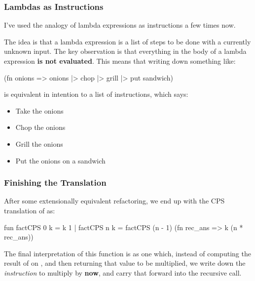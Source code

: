 \documentclass[aspectratio=169, handout]{beamer}
\begin{document}
\begin{frame}[fragile]
  \frametitle{Lambdas as Instructions}

  I've used the analogy of lambda expressions as instructions a few times now.

  \pause
  \vspace{\fill}

  The idea is that a lambda expression is a list of steps to be done with a
  currently unknown input. The key observation is that everything in the body
  of a lambda expression \textbf{is not evaluated}. This means that writing
  down something like:

  \begin{codeblock}
    (fn onions => onions |> chop |> grill |> put sandwich) 
  \end{codeblock}

  is equivalent in intention to a list of instructions, which says:
  \begin{itemize}
    \item Take the onions 
    \item Chop the onions 
    \item Grill the onions 
    \item Put the onions on a sandwich
  \end{itemize}
\end{frame}

\begin{frame}[fragile]
  \frametitle{Finishing the Translation}

  After some extensionally equivalent refactoring, we end up with the 
  CPS translation of  as:

  \begin{codeblock}
    fun factCPS 0 k = k 1
      | factCPS n k = 
          factCPS (n - 1) (fn rec_ans => k (n * rec_ans)) 
  \end{codeblock}

  \pause
  \vspace{\fill}

  The final interpretation of this function is as one which, instead of 
  computing the result of  on , and then returning
  that value to be multiplied, we write down the \textit{instruction} to
  multiply by  \textbf{now}, and carry that forward into the
  recursive call.
\end{frame}
\end{document}
